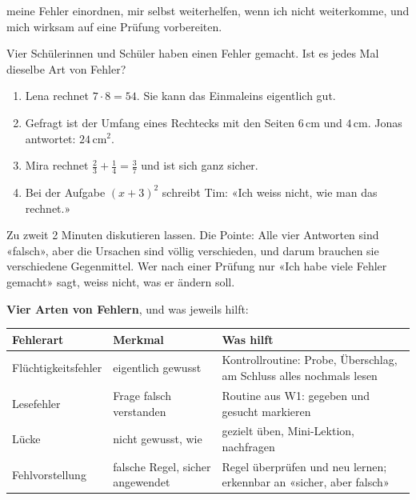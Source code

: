 \documentclass[11pt]{exam}
\begin{document}
\newpage
{}
  {meine Fehler einordnen, mir selbst weiterhelfen, wenn ich nicht
   weiterkomme, und mich wirksam auf eine Prüfung vorbereiten.}

\begin{einstieg}
Vier Schülerinnen und Schüler haben einen Fehler gemacht. Ist es jedes Mal
dieselbe Art von Fehler?
\begin{enumerate}
  \item Lena rechnet $7 \cdot 8 = 54$. Sie kann das Einmaleins eigentlich gut.
  \item Gefragt ist der Umfang eines Rechtecks mit den Seiten $6$\,cm und
        $4$\,cm. Jonas antwortet: $24$\,cm$^2$.
  \item Mira rechnet $\frac{2}{3} + \frac{1}{4} = \frac{3}{7}$ und ist sich
        ganz sicher.
  \item Bei der Aufgabe $(x + 3)^2$ schreibt Tim: «Ich weiss nicht, wie man
        das rechnet.»
\end{enumerate}
\end{einstieg}

\begin{lehrperson}
Zu zweit 2 Minuten diskutieren lassen. Die Pointe: Alle vier Antworten sind
«falsch», aber die Ursachen sind völlig verschieden, und darum brauchen sie
verschiedene Gegenmittel. Wer nach einer Prüfung nur «Ich habe viele Fehler
gemacht» sagt, weiss nicht, was er ändern soll.
\end{lehrperson}

\begin{merke}
\textbf{Vier Arten von Fehlern}, und was jeweils hilft:

\begin{center}
\renewcommand{\arraystretch}{1.4}
\begin{tabular}{|p{3.3cm}|p{4.5cm}|p{5.3cm}|}
  \hline
  \textbf{Fehlerart} & \textbf{Merkmal} & \textbf{Was hilft} \\ \hline
  Flüchtigkeitsfehler & eigentlich gewusst & Kontrollroutine: Probe, Überschlag,
    am Schluss alles nochmals lesen \\ \hline
  Lesefehler & Frage falsch verstanden & Routine aus W1: gegeben und gesucht
    markieren \\ \hline
  Lücke & nicht gewusst, wie & gezielt üben, Mini-Lektion, nachfragen \\ \hline
  Fehlvorstellung & falsche Regel, sicher angewendet & Regel überprüfen und
    neu lernen; erkennbar an «sicher, aber falsch» \\ \hline
\end{tabular}
\end{center}
\end{merke}
\end{document}

